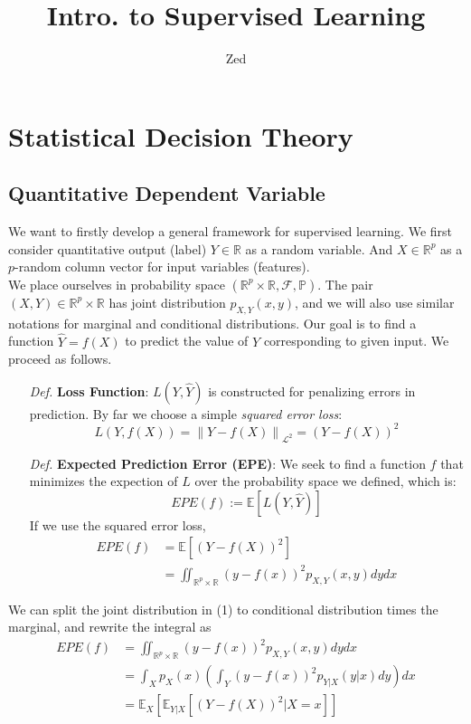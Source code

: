 \documentclass[a4paper, 11pt]{article}
\title{\textbf{Intro. to Supervised Learning}}
\author{Zed}
\begin{document}
\maketitle

\section{Statistical Decision Theory}

\subsection{Quantitative Dependent Variable}
We want to firstly develop a general framework for supervised learning. We first consider quantitative output (label) $Y\in \mathbb{R}$ as a random variable. And $X\in \mathbb{R}^p$ as a $p$-random column vector for input variables (features). 
~\\
We place ourselves in probability space $(\mathbb{R}^p\times \mathbb{R}, \mathcal{F}, \mathbb{P})$. The pair $(X, Y)\in \mathbb{R}^p\times \mathbb{R}$ has joint distribution $p_{X,Y}(x,y)$, and we will also use similar notations for marginal and conditional distributions. Our goal is to find a function $\hat{Y}=f(X)$ to predict the value of $Y$ corresponding to given input. We proceed as follows.
\begin{itemize}
	\item[\textit{Def.}] \textbf{Loss Function}: $L(Y, \hat{Y})$ is constructed for penalizing errors in prediction. By far we choose a simple \emph{squared error loss}:
	$$
	L(Y,f(X)) = \left\|Y-f(X)\right\|_{\mathcal{L}^2} = (Y-f(X))^2
	$$

	\item[\textit{Def.}] \textbf{Expected Prediction Error (EPE)}: We seek to find a function $f$ that minimizes the expection of $L$ over the probability space we defined, which is:
	$$
	EPE(f):=\mathbb{E}\left[L(Y, \hat{Y})\right]
	$$
	If we use the squared error loss,
	\begin{equation}
		\begin{split}
			EPE(f) & = \mathbb{E}\left[(Y-f(X))^2\right] \\
			& = \iint_{\mathbb{R}^p\times \mathbb{R}} (y-f(x))^2 p_{X,Y}(x,y) dyd x
		\end{split}
	\end{equation}
\end{itemize}
We can split the joint distribution in (1) to conditional distribution times the marginal, and rewrite the integral as 
\begin{equation}
	\begin{split}
		EPE(f) & = \iint_{\mathbb{R}^p\times \mathbb{R}} (y-f(x))^2 p_{X,Y}(x,y) dy d x\\
		& = \int_{X} p_{X}(x) \left(\int_Y (y-f(x))^2 p_{Y|X}(y|x) dy\right) d x\\
		& = \mathbb{E}_{X}\left[\mathbb{E}_{Y|X}\left[(Y-f(X))^2|X=x\right]\right]
	\end{split}
\end{equation}
\end{document}
